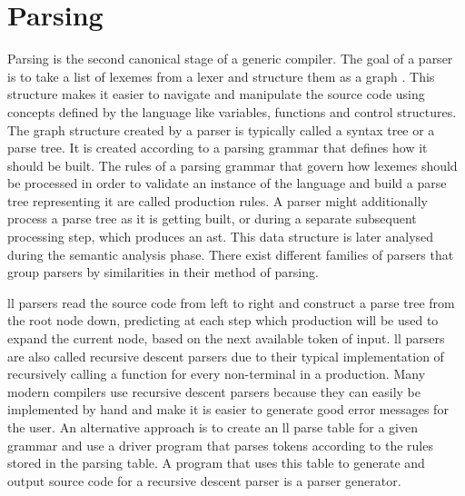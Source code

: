 
\begin{comment}
\cite{sinya_simultaneous_2013} propose a novel type of finite automata called
\gls{sfa}.
\newline \newline
Mention \cite{lin_accelerating_2013, wang_hyperscan_2019,
li_plex_2021, asthagiri_associative_1992} Go and look at references cited in
\cite{zhao_--fly_2015}
\newline \newline
Could mention these but the fella doesn't do anything novel (and his
grammar is questionable) \cite{barve_parallel_2014, barve_parallel_2012,
barve_improved_2015}
\end{comment}

\section{Parsing} \label{lit_review_parsing}

Parsing is the second canonical stage of a generic compiler. The goal of a
parser is to take a list of lexemes from a lexer and structure them as a graph
\citep{scott_programming_2015}. This structure makes it easier to navigate
and manipulate the source code using concepts defined by the language like
variables, functions and control structures. The graph structure created by
a parser is typically called a syntax tree or a parse tree. It is created
according to a parsing grammar that defines how it should be built. The rules
of a parsing grammar that govern how lexemes should be processed in order to
validate an instance of the language and build a parse tree representing it
are called production rules. A parser might additionally process a parse tree
as it is getting built, or during a separate subsequent processing step, which
produces an \gls{ast}. This data structure is later analysed during the semantic
analysis phase. There exist different families of parsers that group parsers by
similarities in their method of parsing.

\gls{ll} parsers read the source code from left to right and construct a parse
tree from the root node down, predicting at each step which production will be
used to expand the current node, based on the next available token of input.
\gls{ll} parsers are also called recursive descent parsers due to their typical
implementation of recursively calling a function for every non-terminal in a
production. Many modern compilers use recursive descent parsers because they
can easily be implemented by hand and make it is easier to generate good error
messages for the user. An alternative approach is to create an \gls{ll} parse
table for a given grammar and use a driver program that parses tokens according
to the rules stored in the parsing table. A program that uses this table to
generate and output source code for a recursive descent parser is a parser
generator.

